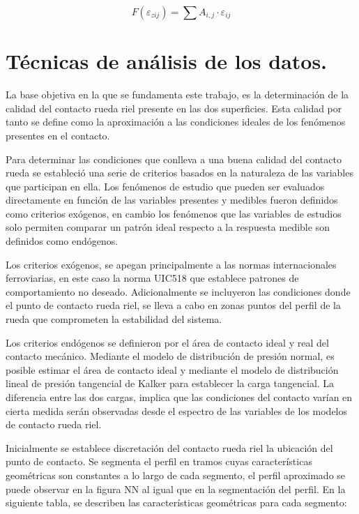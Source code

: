 \documentclass[main]{subfiles}
\begin{document}
\begin{equation}
F(\varepsilon_{zij})=\sum A_{i,j} \cdot \varepsilon_{ij}
\end{equation}

\section{Técnicas de análisis de los datos.}

La base objetiva en la que se fundamenta este trabajo, es la determinación de la calidad del contacto rueda riel presente en las dos superficies. Esta calidad por tanto se define como la aproximación a las condiciones ideales de los fenómenos presentes en el contacto.

Para determinar las condiciones que conlleva a una buena calidad del contacto rueda se estableció una serie de criterios basados en la naturaleza de las variables que participan en ella. Los fenómenos de estudio que pueden ser evaluados directamente en función de las variables presentes y medibles fueron definidos como criterios exógenos, en cambio los fenómenos que las variables de estudios solo permiten comparar un patrón ideal respecto a la respuesta medible son definidos como endógenos.

Los criterios exógenos, se apegan principalmente a las normas internacionales ferroviarias, en este caso la norma UIC518 que establece patrones de comportamiento no deseado. Adicionalmente se incluyeron las condiciones donde el punto de contacto rueda riel, se lleva a cabo en zonas puntos del perfil de la rueda que comprometen la estabilidad del sistema.


Los criterios endógenos se definieron por el área de contacto ideal y real del contacto mecánico. Mediante el modelo de distribución de presión normal, es posible estimar el área de contacto ideal y mediante el modelo de distribución lineal de presión tangencial de Kalker para establecer la carga tangencial. La diferencia entre las dos cargas, implica que las condiciones del contacto varían en cierta medida serán observadas desde el espectro de las variables de los modelos de contacto rueda riel. 

Inicialmente se establece discretación del contacto rueda riel la ubicación del punto de contacto. Se segmenta el perfil en tramos cuyas características geométricas son constantes a lo largo de cada segmento, el perfil aproximado se puede observar en la figura NN al igual que en la segmentación del perfil. En la siguiente tabla, se describen las características geométricas para cada segmento:
\newline
\end{document}
